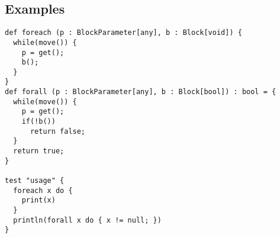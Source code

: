 \subsection{Examples}

\begin{lstlisting}[language=tyr]
def foreach (p : BlockParameter[any], b : Block[void]) {
  while(move()) {
	p = get();
	b();
  }
}
def forall (p : BlockParameter[any], b : Block[bool]) : bool = {
  while(move()) {
    p = get();
    if(!b())
      return false;
  }
  return true;
}

test "usage" {
  foreach x do {
    print(x)
  }
  println(forall x do { x != null; })
}
\end{lstlisting}
